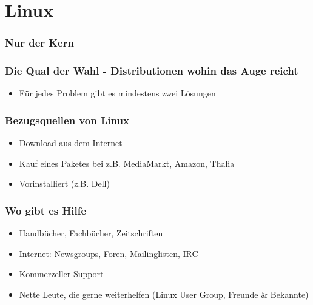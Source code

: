 \documentclass[compress]{beamer}
\begin{document}
\section{Linux}

\begin{frame}
	\frametitle{Nur der Kern}
\end{frame}

\begin{frame}
	\frametitle{Die Qual der Wahl - Distributionen wohin das Auge reicht}
	\begin{block}{}
		\begin{itemize}
			\item Für jedes Problem gibt es mindestens zwei Lösungen
		\end{itemize}
	\end{block}
\end{frame}

\begin{frame}
	\frametitle{Bezugsquellen von Linux}
	\begin{itemize}
		\item Download aus dem Internet
		\item Kauf eines Paketes bei z.B. MediaMarkt, Amazon, Thalia
		\item Vorinstalliert (z.B. Dell)
	\end{itemize}
\end{frame}

\begin{frame}
	\frametitle{Wo gibt es Hilfe}
	\begin{itemize}
		\item Handbücher, Fachbücher, Zeitschriften
		\item Internet: Newsgroups, Foren, Mailinglisten, IRC
		\item Kommerzeller Support
		\item Nette Leute, die gerne weiterhelfen (Linux User Group, Freunde \& Bekannte)
	\end{itemize}
\end{frame}
\end{document}
